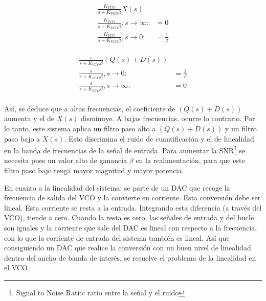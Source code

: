 \documentclass[12pt]{report} %
\begin{document}
	\begin{figure}[H]
		\label{vco-closed-loop-terms-x}
		\begin{equation}
		\begin{array}{lcl}
		\frac{K_{VCO}}{s + K_{VCO}\beta}X(s) & \\
		\frac{K_{VCO}}{s + K_{VCO}\beta}, s \to \infty: & = 0 \\
		\frac{K_{VCO}}{s + K_{VCO}\beta}, s \to 0: & = \frac{1}{\beta} \\
		\end{array}
		\end{equation}
	\end{figure}

	\begin{figure}[H]
		\label{vco-closed-loop-terms-q}
		\begin{equation}
		\begin{array}{lcl}
		\frac{s}{s + K_{VCO}\beta}(Q(s)+D(s)) & \\
		\frac{s}{s + K_{VCO}\beta}, s \to 0: & = \frac{1}{\beta} \\
		\frac{s}{s + K_{VCO}\beta}, s \to \infty: & = 0 \\
		\end{array}
		\end{equation}
	\end{figure}

	Así, se deduce que a altas frecuencias, el coeficiente de $(Q(s)+D(s))$ aumenta y el de $X(s)$ disminuye. A bajas frecuencias, ocurre lo contrario. Por lo tanto, este sistema aplica un filtro paso alto a $(Q(s)+D(s))$ y un filtro paso bajo a $X(s)$. Esto discrimina el ruido de cuantificación y el de linealidad en la banda de frecuencias de la señal de entrada. Para aumentar la SNR\footnote{Signal to Noise Ratio: ratio entre la señal y el ruido} se necesita pues un valor alto de ganancia $\beta$ en la realimentación, para que este filtro paso bajo tenga mayor magnitud y mayor potencia.
	
	En cuanto a la linealidad del sistema: se parte de un DAC que recoge la frecuencia de salida del VCO y la convierte en corriente. Esta conversión debe ser lineal. Esta corriente se resta a la entrada. Integrando esta diferencia (a través del VCO), tiende a cero. Cuando la resta es cero, las señales de entrada y del bucle son iguales y la corriente que sale del DAC es lineal con respecto a la frecuencia, con lo que la corriente de entrada del sistema también es lineal.  Así que consiguiendo un DAC que realice la conversión con un buen nivel de linealidad dentro del ancho de banda de interés, se resuelve el problema de la linealidad en el VCO.
	
\end{document}
